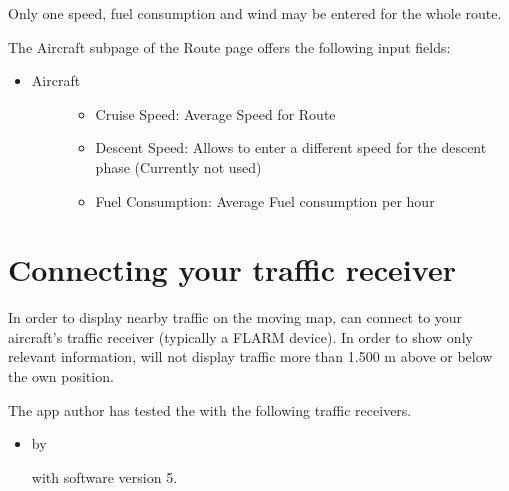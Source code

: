 \documentclass[letterpaper,10pt,english]{sphinxmanual}
\begin{document}
\sphinxAtStartPar
Only one speed, fuel consumption and wind may be entered for the whole route.

\sphinxAtStartPar
The Aircraft sub\sphinxhyphen{}page of the Route page offers the following input fields:
\begin{itemize}
\item {} \begin{description}
\item[{Aircraft}] \leavevmode\begin{itemize}
\item {} 
\sphinxAtStartPar
Cruise Speed: Average Speed for Route

\item {} 
\sphinxAtStartPar
Descent Speed: Allows to enter a different speed for the descent phase (Currently not used)

\item {} 
\sphinxAtStartPar
Fuel Consumption: Average Fuel consumption per hour

\end{itemize}

\end{description}

\end{itemize}


\chapter{Connecting your traffic receiver}
\label{\detokenize{02-steps/traffic:connecting-your-traffic-receiver}}\label{\detokenize{02-steps/traffic::doc}}
\sphinxAtStartPar
In order to display nearby traffic on the moving map,  can connect to your aircraft’s traffic receiver (typically a FLARM
device).  In order to show only relevant information,  will not display traffic more than 1.500 m above or below the own
position.

\sphinxAtStartPar
The app author has tested the  with the following
traffic receivers.
\begin{itemize}
\item {} 
\sphinxAtStartPar
{}%
\begin{footnote}[9]\sphinxAtStartFootnote
{}
%
\end{footnote} by %
\begin{footnote}[10]\sphinxAtStartFootnote
{}
%
\end{footnote} with software version 5.

\end{itemize}
\end{document}
